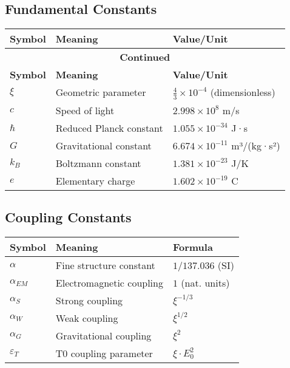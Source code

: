 \documentclass[12pt,a4paper]{article}
\begin{document}
\subsection{Fundamental Constants}
\begin{longtable}{lll}
	\toprule
	\textbf{Symbol} & \textbf{Meaning} & \textbf{Value/Unit} \\
	\midrule
	\endfirsthead
	\multicolumn{3}{c}{{\bfseries Continued}} \\
	\toprule
	\textbf{Symbol} & \textbf{Meaning} & \textbf{Value/Unit} \\
	\midrule
	\endhead
	\bottomrule
	\endfoot
	\bottomrule
	\endlastfoot
	
	$\xi$ & Geometric parameter & $\frac{4}{3} \times 10^{-4}$ (dimensionless) \\
	$c$ & Speed of light & $2.998 \times 10^8$ m/s \\
	$\hbar$ & Reduced Planck constant & $1.055 \times 10^{-34}$ J·s \\
	$G$ & Gravitational constant & $6.674 \times 10^{-11}$ m³/(kg·s²) \\
	$k_B$ & Boltzmann constant & $1.381 \times 10^{-23}$ J/K \\
	$e$ & Elementary charge & $1.602 \times 10^{-19}$ C \\
\end{longtable}

\subsection{Coupling Constants}
\begin{longtable}{lll}
	\toprule
	\textbf{Symbol} & \textbf{Meaning} & \textbf{Formula} \\
	\midrule
	$\alpha$ & Fine structure constant & $1/137.036$ (SI) \\
	$\alpha_{EM}$ & Electromagnetic coupling & $1$ (nat. units) \\
	$\alpha_S$ & Strong coupling & $\xi^{-1/3}$ \\
	$\alpha_W$ & Weak coupling & $\xi^{1/2}$ \\
	$\alpha_G$ & Gravitational coupling & $\xi^{2}$ \\
	$\varepsilon_T$ & T0 coupling parameter & $\xi \cdot E_0^2$ \\
	\bottomrule
\end{longtable}
\end{document}
